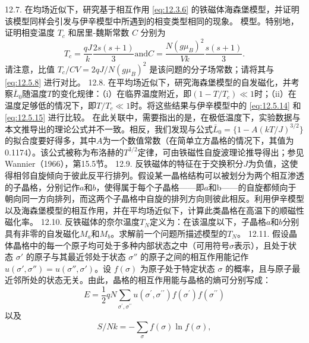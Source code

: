 12.7. 在均场近似下，研究基于相互作用 \autoref{eq:12.3.6} 的铁磁体海森堡模型，并证明该模型同样会引发与伊辛模型中所遇到的相变类型相同的现象。
模型。特别地，证明相变温度 \(T_{c}\) 和居里-魏斯常数 \(C\) 分别为
\begin{equation}\tag{12.13.28}\label{eq:12.13.28}
T _ { c } = \frac { q J } { k } \frac { 2 s ( s + 1 ) } { 3 }  \mathrm { a n d }  C = \frac { N ( g \mu _ { B } ) ^{2} } { V k } \frac { s ( s + 1 ) } { 3 } .
\end{equation}
请注意，比值 \(T_{c}/CV=2qJ/N(g\mu_{B})^{2}\) 是该问题的分子场常数；请将其与 \autoref{eq:12.5.8} 进行对比。
12.8. 在平均场近似下，研究海森堡模型的自发磁化，并考察\(\overline{L}_{0}\)随温度\(T\)的变化规律：（i）在临界温度附近，即\((1-T/T_{c}) \ll 1\)时；（ii）在温度足够低的情况下，即\(T/T_{c} \ll 1\)时。将这些结果与伊辛模型中的 \autoref{eq:12.5.14} 和 \autoref{eq:12.5.15} 进行比较。
在此关联中，需要指出的是，在极低温度下，实验数据与本文推导出的理论公式并不一致。相反，我们发现与公式\(\bar{L}_{0}=\{1-A(kT/J)^{3/2}\}\)的拟合度要好得多，其中\(A\)为一个数值常数（在简单立方晶格的情况下，其值为0.1174）。该公式被称为布洛赫的\(T^{3/2}\)定律，可由铁磁性自旋波理论推导得出；参见Wannier（1966），第15.5节。
12.9. 反铁磁体的特征在于交换积分\(J\)为负值，这使得相邻自旋倾向于彼此反平行排列。假设某一晶格结构可以被划分为两个相互渗透的子晶格，分别记作\(a\)和\(b\)，使得属于每个子晶格——即\(a和\)b——的自旋都倾向于朝向同一方向排列，而这两个子晶格中自旋的排列方向则彼此相反。利用伊辛模型以及海森堡模型的相互作用，并在平均场近似下，计算此类晶格在高温下的顺磁性磁化率。
12.10. 反铁磁体的奈尔温度\(T_{N}\)定义为：在该温度以下，子晶格\(a\)和\(b\)分别具有非零的自发磁化\(M_{a}\)和\(M_{b}\)。求解前一个问题所描述模型的\(T_{N}\)。
12.11. 假设晶体晶格中的每一个原子均可处于多种内部状态之中（可用符号\(\sigma\)表示），且处于状态 \(\sigma'\) 的原子与其最近邻处于状态 \(\sigma''\) 的原子之间的相互作用能记作 \(u(\sigma',\sigma'')=u(\sigma'',\sigma')\)。设 \(f(\sigma)\) 为原子处于特定状态 \(\sigma\) 的概率，且与原子最近邻所处的状态无关。由此，晶格的相互作用能与晶格的熵可分别写成：
\begin{equation}\tag{12.13.29}\label{eq:12.13.29}
E = \frac { 1 } { 2 } q N \sum _ { \sigma ^{\prime} , \sigma ^{\prime \prime} } u ( \sigma ^{\prime} , \sigma ^{\prime \prime} ) f ( \sigma ^{\prime} ) f ( \sigma ^{\prime \prime} )
\end{equation}
以及
\begin{equation}\tag{12.13.30}\label{eq:12.13.30}
S / N k = - \sum _ { \sigma } f ( \sigma ) \ln f ( \sigma ) ,
\end{equation}
